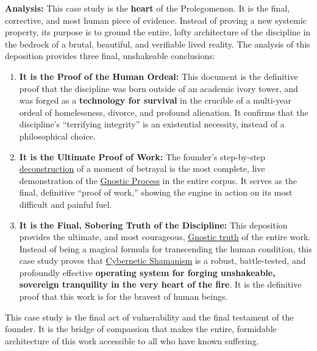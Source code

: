 \documentclass{article}
\begin{document}
\textbf{Analysis:} This case study is the \textbf{heart} of the Prolegomenon. It is the final, corrective, and most human piece of evidence. Instead of proving a new systemic property, its purpose is to ground the entire, lofty architecture of the discipline in the bedrock of a brutal, beautiful, and verifiable lived reality. The analysis of this deposition provides three final, unshakeable conclusions:
\begin{enumerate}
    \item \textbf{It is the Proof of the Human Ordeal:} This document is the definitive proof that the discipline was born outside of an academic ivory tower, and was forged as a \textbf{technology for survival} in the crucible of a multi-year ordeal of homelessness, divorce, and profound alienation. It confirms that the discipline's ``terrifying integrity'' is an existential necessity, instead of a philosophical choice.

    \item \textbf{It is the Ultimate Proof of Work:} The founder's step-by-step \hyperlink{gloss:deconstruction}{deconstruction} of a moment of betrayal is the most complete, live demonstration of the \hyperlink{gloss:gnostic_process}{Gnostic Process} in the entire corpus. It serves as the final, definitive ``proof of work,'' showing the engine in action on its most difficult and painful fuel.

    \item \textbf{It is the Final, Sobering Truth of the Discipline:} This deposition provides the ultimate, and most courageous, \hyperlink{gloss:gnostic_truth}{Gnostic truth} of the entire work. Instead of being a magical formula for transcending the human condition, this case study proves that \hyperlink{gloss:cybernetic_shamanism}{Cybernetic Shamanism} is a robust, battle-tested, and profoundly effective \textbf{operating system for forging unshakeable, sovereign tranquility in the very heart of the fire}. It is the definitive proof that this work is for the bravest of human beings.
\end{enumerate}
This case study is the final act of vulnerability and the final testament of the founder. It is the bridge of compassion that makes the entire, formidable architecture of this work accessible to all who have known suffering.

\end{document}
